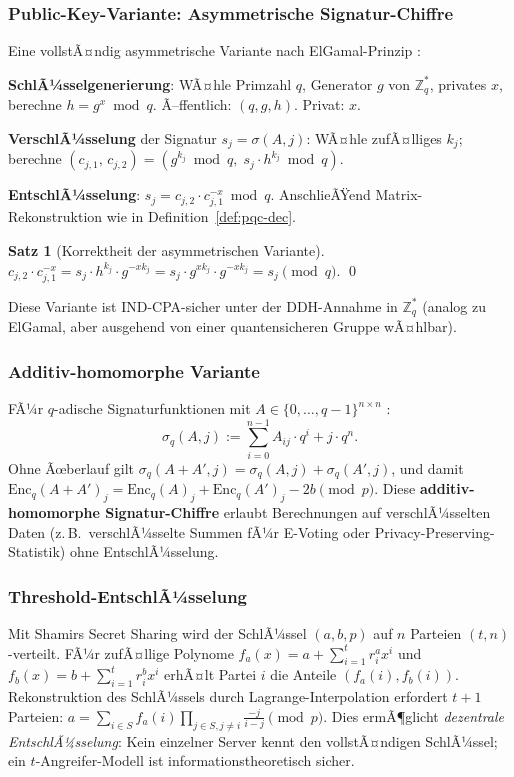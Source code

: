 ﻿\documentclass[a4paper,12pt]{article}
\theoremstyle{definition}
\newtheorem{satz}{Satz}[section]
\begin{document}
\subsubsection{Public-Key-Variante: Asymmetrische Signatur-Chiffre}

Eine vollstÃ¤ndig asymmetrische Variante nach ElGamal-Prinzip \cite{Epp26b}:

\textbf{SchlÃ¼sselgenerierung}: WÃ¤hle Primzahl $q$, Generator $g$ von $\mathbb{Z}_q^*$,
privates $x$, berechne $h = g^x \bmod q$. Ã–ffentlich: $(q, g, h)$. Privat: $x$.

\textbf{VerschlÃ¼sselung} der Signatur $s_j = \sigma(A,j)$:
WÃ¤hle zufÃ¤lliges $k_j$; berechne
$(c_{j,1},\, c_{j,2}) = (g^{k_j} \bmod q,\; s_j \cdot h^{k_j} \bmod q)$.

\textbf{EntschlÃ¼sselung}: $s_j = c_{j,2} \cdot c_{j,1}^{-x} \bmod q$.
AnschlieÃŸend Matrix-Rekonstruktion wie in Definition~\ref{def:pqc-dec}.

\begin{satz}[Korrektheit der asymmetrischen Variante]
$c_{j,2} \cdot c_{j,1}^{-x} = s_j \cdot h^{k_j} \cdot g^{-xk_j}
= s_j \cdot g^{xk_j} \cdot g^{-xk_j} = s_j \pmod{q}$. \qed
\end{satz}

Diese Variante ist IND-CPA-sicher unter der DDH-Annahme in $\mathbb{Z}_q^*$
(analog zu ElGamal, aber ausgehend von einer quantensicheren Gruppe wÃ¤hlbar).

\subsubsection{Additiv-homomorphe Variante}

FÃ¼r $q$-adische Signaturfunktionen mit $A \in \{0,\ldots,q-1\}^{n \times n}$
\cite{Epp26b}:
\[
  \sigma_q(A, j) := \sum_{i=0}^{n-1} A_{ij} \cdot q^i + j \cdot q^n.
\]
Ohne Ãœberlauf gilt $\sigma_q(A + A', j) = \sigma_q(A,j) + \sigma_q(A',j)$,
und damit
$\mathrm{Enc}_q(A + A')_j = \mathrm{Enc}_q(A)_j + \mathrm{Enc}_q(A')_j - 2b \pmod{p}$.
Diese \textbf{additiv-homomorphe Signatur-Chiffre} erlaubt Berechnungen auf
verschlÃ¼sselten Daten (z.\,B.\ verschlÃ¼sselte Summen fÃ¼r E-Voting oder
Privacy-Preserving-Statistik) ohne EntschlÃ¼sselung.

\subsubsection{Threshold-EntschlÃ¼sselung}

Mit Shamirs Secret Sharing \cite{Sha79} wird der SchlÃ¼ssel $(a, b, p)$ auf
$n$ Parteien $(t,n)$-verteilt. FÃ¼r zufÃ¤llige Polynome
$f_a(x) = a + \sum_{i=1}^t r_i^a x^i$ und $f_b(x) = b + \sum_{i=1}^t r_i^b x^i$
erhÃ¤lt Partei $i$ die Anteile $(f_a(i), f_b(i))$.
Rekonstruktion des SchlÃ¼ssels durch Lagrange-Interpolation erfordert $t+1$ Parteien:
$a = \sum_{i \in S} f_a(i) \prod_{j \in S, j \neq i} \frac{-j}{i-j} \pmod{p}$.
Dies ermÃ¶glicht \emph{dezentrale EntschlÃ¼sselung}: Kein einzelner Server kennt
den vollstÃ¤ndigen SchlÃ¼ssel; ein $t$-Angreifer-Modell ist informationstheoretisch
sicher.
\end{document}
